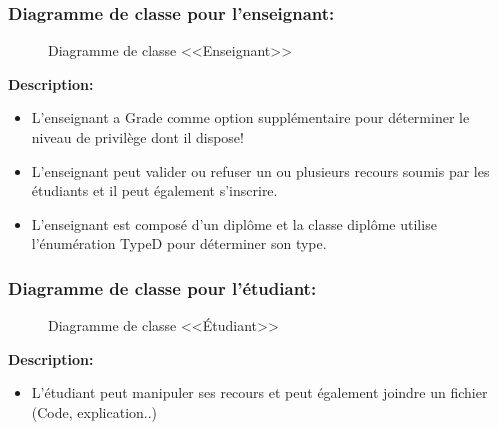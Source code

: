 \documentclass[12pt]{report}
\begin{document}
\newpage

\subsubsection{Diagramme de classe pour l'enseignant:}

\begin{figure}[h]
\centering
    \caption{Diagramme de classe <<Enseignant>>}
\end{figure}

\vspace{0.3in}

\textbf{Description:}

\begin{itemize}
    \item L'enseignant a Grade comme option supplémentaire pour déterminer le niveau de privilège dont il dispose!
    \item L'enseignant peut valider ou refuser un ou plusieurs recours soumis par les étudiants et il peut également s'inscrire.
    \item L'enseignant est composé d'un diplôme et la classe diplôme utilise l'énumération TypeD pour déterminer son type.
\end{itemize}

\newpage

\subsubsection{Diagramme de classe pour l'étudiant:}

\begin{figure}[h]
\centering
    \caption{Diagramme de classe <<Étudiant>>}
\end{figure}

\vspace{-0.1in}

\textbf{Description:}

\vspace{-0.1in}
\begin{itemize}
    \item L'étudiant peut manipuler ses recours et peut également joindre un fichier (Code, explication..)
\end{itemize}
\end{document}
